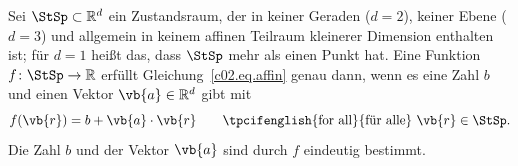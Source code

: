 \begin{lemma}\label{c02.lem.koordinaten}
  Sei $\StSp \subset \mathbb{R}^d$ ein Zustandsraum, der in keiner Geraden ($d = 2$), keiner
  Ebene ($d = 3$) und allgemein in keinem affinen Teilraum kleinerer Dimension enthalten
  ist; für $d = 1$ heißt das, dass $\StSp$ mehr als einen Punkt hat. Eine Funktion
  $f\colon \StSp \to \mathbb{R}$ erfüllt Gleichung~\eqref{c02.eq.affin} genau dann, wenn es
  eine Zahl $b$ und einen Vektor $\vb{a} \in \mathbb{R}^d$ gibt mit
  \begin{equation}\label{c02.eq.koordinaten}
    f(\vb{r}) = b + \vb{a}\cdot\vb{r}
    \qquad \text{\tpcifenglish{for all}{für alle}}\ \vb{r} \in \StSp .
  \end{equation}
  Die Zahl $b$ und der Vektor $\vb{a}$ sind durch $f$ eindeutig bestimmt.
\end{lemma}

